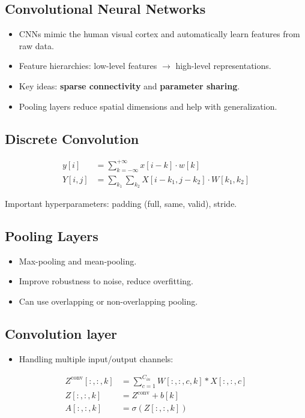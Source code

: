 \subsection{Convolutional Neural Networks}
\begin{itemize}[topsep=0pt]
    \item CNNs mimic the human visual cortex and automatically learn features from raw data.
    \item Feature hierarchies: low-level features $\rightarrow$ high-level representations.
    \item Key ideas: \textbf{sparse connectivity} and \textbf{parameter sharing}.
    \item Pooling layers reduce spatial dimensions and help with generalization.
\end{itemize}

\subsection{Discrete Convolution}
\begin{align*}
y[i] &= \sum_{k=-\infty}^{+\infty} x[i-k] \cdot w[k] \\
Y[i,j] &= \sum_{k_1} \sum_{k_2} X[i-k_1, j-k_2] \cdot W[k_1, k_2]
\end{align*}

\noindent
Important hyperparameters: padding (full, same, valid), stride.

\subsection{Pooling Layers}
\begin{itemize}
    \item Max-pooling and mean-pooling.
    \item Improve robustness to noise, reduce overfitting.
    \item Can use overlapping or non-overlapping pooling.
\end{itemize}

\subsection{Convolution layer}
\begin{itemize}
    \item Handling multiple input/output channels:
\end{itemize}

\begin{align*}
Z^{\text{conv}}[:,:,k] &= \sum_{c=1}^{C_{in}} W[:,:,c,k] * X[:,:,c] \\
Z[:,:,k] &= Z^{\text{conv}} + b[k] \\
A[:,:,k] &= \sigma(Z[:,:,k])
\end{align*}

